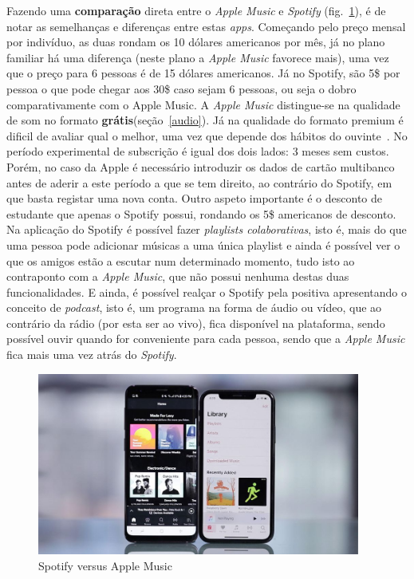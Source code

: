 \documentclass{report}
\begin{document}
Fazendo uma \textbf{comparação} direta entre o \textit{Apple Music} e \textit{Spotify} (fig.~\ref{fig:comparação}), é de notar as semelhanças e diferenças entre estas \textit{apps}. Começando pelo preço mensal por indivíduo, as duas rondam os 10 dólares americanos por mês, já no plano familiar há uma diferença (neste plano a \textit{Apple Music} favorece mais), uma vez que o preço para 6 pessoas é de 15 dólares americanos. Já no Spotify, são 5\$ por pessoa o que pode chegar aos 30\$ caso sejam 6 pessoas, ou seja o dobro comparativamente com o Apple Music. 
A \textit{Apple Music} distingue-se na qualidade de som no formato \textbf{grátis}(seção~\ref{audio}). Já na qualidade do formato premium é dificil de avaliar qual o melhor, uma vez que depende dos hábitos do ouvinte~\cite{davehenry2020}. 
No período experimental de subscrição é igual dos dois lados: 3 meses sem custos. Porém, no caso da Apple é necessário introduzir os dados de cartão multibanco antes de aderir a este período a que se tem direito, ao contrário do Spotify, em que basta registar uma nova conta. Outro aspeto importante é o desconto de estudante que apenas o Spotify possui, rondando os 5\$ americanos de desconto. Na aplicação do Spotify é possível fazer \textit{playlists colaborativas}, isto é, mais do que uma pessoa pode adicionar músicas a uma única playlist e ainda é possível ver o que os amigos estão a escutar num determinado momento, tudo isto ao contraponto com a \textit{Apple Music}, que não possui nenhuma destas duas funcionalidades. E ainda, é possível realçar o Spotify pela positiva apresentando o conceito de \textit{podcast}, isto é, um programa na forma de áudio ou vídeo, que ao contrário da rádio (por esta ser ao vivo), fica disponível na plataforma, sendo possível ouvir quando for conveniente para cada pessoa, sendo que a \textit{Apple Music} fica mais uma vez atrás do \textit{Spotify}.

% 
\begin{figure}
    \centering     
    \includegraphics[width=\textwidth,height=60mm]{Imagens/applemusic-spotify.jpg}     
    \caption{Spotify versus Apple Music} 
    \label{fig:comparação} 
\end{figure}
%
\end{document}
